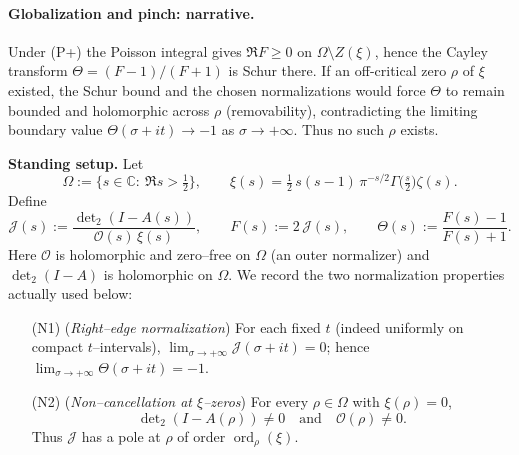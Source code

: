 \documentclass[11pt]{article}
\theoremstyle{definition}
\theoremstyle{remark}
\begin{document}
\vspace{1.0cm}
\paragraph{Globalization and pinch: narrative.}
Under (P+) the Poisson integral gives $\Re F\ge 0$ on $\Omega\setminus Z(\xi)$, hence
the Cayley transform $\Theta=(F-1)/(F+1)$ is Schur there.
If an off-critical zero $\rho$ of $\xi$ existed, the Schur bound and the chosen normalizations would
force $\Theta$ to remain bounded and holomorphic across $\rho$ (removability),
contradicting the limiting boundary value $\Theta(\sigma+it)\to-1$ as $\sigma\to+\infty$.
Thus no such $\rho$ exists.


\textbf{Standing setup.}
Let
\[
\Omega:=\{s\in\mathbb C:\ \Re s>\tfrac12\},\qquad
\xi(s)=\tfrac12\,s(s-1)\,\pi^{-s/2}\Gamma\!\big(\tfrac s2\big)\zeta(s).
\]
Define
\[
\mathcal J(s):=\frac{\det\nolimits_2(I-A(s))}{\mathcal O(s)\,\xi(s)},\qquad
F(s):=2\,\mathcal J(s),\qquad
\Theta(s):=\frac{F(s)-1}{F(s)+1}.
\]
Here $\mathcal O$ is holomorphic and zero--free on $\Omega$ (an outer normalizer) and
$\det\nolimits_2(I-A)$ is holomorphic on $\Omega$.
We record the two normalization properties actually used below:
\begin{itemize}
\item[(N1)] (\emph{Right--edge normalization})
  For each fixed $t$ (indeed uniformly on compact $t$–intervals),
  $\displaystyle\lim_{\sigma\to+\infty}\mathcal J(\sigma+it)=0$; hence $\displaystyle\lim_{\sigma\to+\infty}\Theta(\sigma+it)=-1$.
\item[(N2)] (\emph{Non--cancellation at $\xi$--zeros}) For every $\rho\in\Omega$ with $\xi(\rho)=0$,
\[
\det\nolimits_2(I-A(\rho))\neq0\quad\text{and}\quad \mathcal O(\rho)\neq0.
\]
Thus $\mathcal J$ has a pole at $\rho$ of order $\operatorname{ord}_\rho(\xi)$.
\end{itemize}
\end{document}
